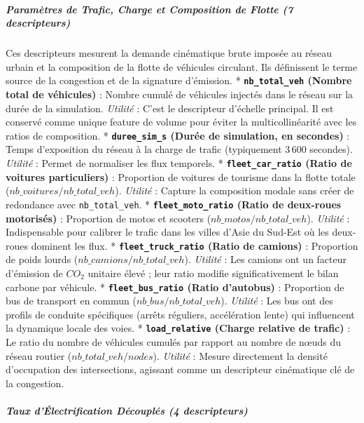 \documentclass[10pt, a4paper]{article}
\begin{document}
\subparagraph{Paramètres de Trafic, Charge et Composition de Flotte (7
descripteurs)}\label{paramuxe8tres-de-trafic-charge-et-composition-de-flotte-7-descripteurs}

Ces descripteurs mesurent la demande cinématique brute imposée au réseau
urbain et la composition de la flotte de véhicules circulant. Ils
définissent le terme source de la congestion et de la signature
d'émission. * \textbf{\texttt{nb\_total\_veh} (Nombre total de
véhicules)} : Nombre cumulé de véhicules injectés dans le réseau sur la
durée de la simulation. \emph{Utilité} : C'est le descripteur d'échelle
principal. Il est conservé comme unique feature de volume pour éviter la
multicollinéarité avec les ratios de composition. *
\textbf{\texttt{duree\_sim\_s} (Durée de simulation, en secondes)} :
Temps d'exposition du réseau à la charge de trafic (typiquement 3\,600
secondes). \emph{Utilité} : Permet de normaliser les flux temporels. *
\textbf{\texttt{fleet\_car\_ratio} (Ratio de voitures particuliers)} :
Proportion de voitures de tourisme dans la flotte totale
(\(nb\_voitures / nb\_total\_veh\)). \emph{Utilité} : Capture la
composition modale sans créer de redondance avec
\texttt{nb\_total\_veh}. * \textbf{\texttt{fleet\_moto\_ratio} (Ratio de
deux-roues motorisés)} : Proportion de motos et scooters
(\(nb\_motos / nb\_total\_veh\)). \emph{Utilité} : Indispensable pour
calibrer le trafic dans les villes d'Asie du Sud-Est où les deux-roues
dominent les flux. * \textbf{\texttt{fleet\_truck\_ratio} (Ratio de
camions)} : Proportion de poids lourds
(\(nb\_camions / nb\_total\_veh\)). \emph{Utilité} : Les camions ont un
facteur d'émission de \(CO_2\) unitaire élevé ; leur ratio modifie
significativement le bilan carbone par véhicule. *
\textbf{\texttt{fleet\_bus\_ratio} (Ratio d'autobus)} : Proportion de
bus de transport en commun (\(nb\_bus / nb\_total\_veh\)).
\emph{Utilité} : Les bus ont des profils de conduite spécifiques (arrêts
réguliers, accélération lente) qui influencent la dynamique locale des
voies. * \textbf{\texttt{load\_relative} (Charge relative de trafic)} :
Le ratio du nombre de véhicules cumulés par rapport au nombre de nœuds
du réseau routier (\(nb\_total\_veh / nodes\)). \emph{Utilité} : Mesure
directement la densité d'occupation des intersections, agissant comme un
descripteur cinématique clé de la congestion.

\subparagraph{Taux d'Électrification Découplés (4
descripteurs)}\label{taux-duxe9lectrification-duxe9coupluxe9s-4-descripteurs}
\end{document}
